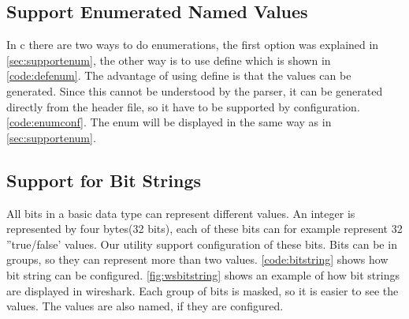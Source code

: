 \subsection{Support Enumerated Named Values}
In \Gls{c} there are two ways to do enumerations, the first option was explained in 
\autoref{sec:supportenum}, the other way is to use \gls{define} which is shown in 
\autoref{code:defenum}. The advantage of using \gls{define} is that the values 
can be generated. Since this cannot be understood by the \gls{parser}, it can be 
generated directly from the \gls{header} file, so it have to be supported by 
configuration. \autoref{code:enumconf}. The \gls{enum} will be displayed in 
the same way as in \autoref{sec:supportenum}.





\subsection{Support for Bit Strings}
All bits in a basic data type can represent different values. An \gls{integer} is 
represented by four bytes(32 bits), each of these bits can for example represent 
32 ''true/false' values. Our \gls{utility} support configuration of these bits. Bits 
can be in groups, so they can represent more than two values. 
\autoref{code:bitstring} shows how \gls{bit string} can be configured. 
\autoref{fig:wsbitstring} shows an example of how \glspl{bit string} are displayed in 
\Gls{wireshark}. Each group of bits is masked, so it is easier to see the values. 
The values are also named, if they are configured.

